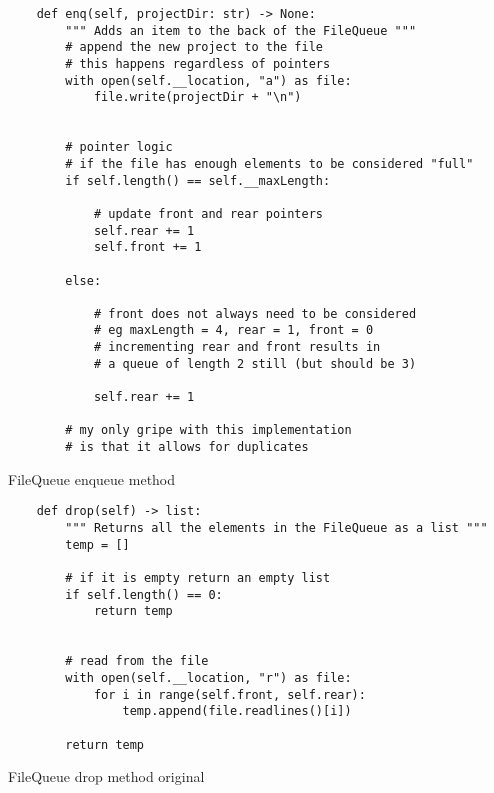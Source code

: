 \newpage
\begin{listing}[!ht]
    \begin{verbatim}
    def enq(self, projectDir: str) -> None:
        """ Adds an item to the back of the FileQueue """
        # append the new project to the file
        # this happens regardless of pointers
        with open(self.__location, "a") as file:
            file.write(projectDir + "\n")
        
        
        # pointer logic
        # if the file has enough elements to be considered "full"
        if self.length() == self.__maxLength:
                
            # update front and rear pointers
            self.rear += 1
            self.front += 1
        
        else:
            
            # front does not always need to be considered  
            # eg maxLength = 4, rear = 1, front = 0
            # incrementing rear and front results in 
            # a queue of length 2 still (but should be 3)
            
            self.rear += 1
            
        # my only gripe with this implementation 
        # is that it allows for duplicates
    \end{verbatim}
    \caption{FileQueue enqueue method}
    \label{sc:fileq-enq-method}
\end{listing}

\newpage
\begin{listing}[!ht]
    \begin{verbatim}
    def drop(self) -> list:
        """ Returns all the elements in the FileQueue as a list """
        temp = []
        
        # if it is empty return an empty list
        if self.length() == 0:
            return temp
        
        
        # read from the file
        with open(self.__location, "r") as file:
            for i in range(self.front, self.rear):
                temp.append(file.readlines()[i])
                
        return temp
    \end{verbatim}
    \caption{FileQueue drop method original}
    \label{sc:fileq-drop-method-og}
\end{listing}

